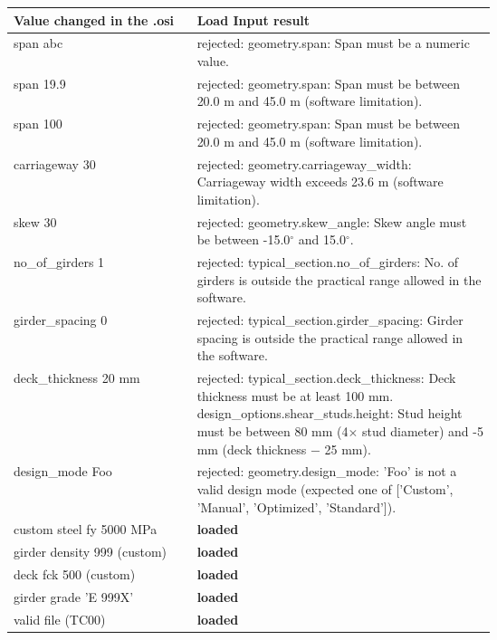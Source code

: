\begin{tabular}{@{}l>{\raggedright\arraybackslash}p{0.62\linewidth}@{}}
\toprule
Value changed in the .osi & Load Input result\\
\midrule
span abc & rejected: geometry.span: Span must be a numeric value.\\
span 19.9 & rejected: geometry.span: Span must be between 20.0 m and 45.0 m (software limitation).\\
span 100 & rejected: geometry.span: Span must be between 20.0 m and 45.0 m (software limitation).\\
carriageway 30 & rejected: geometry.carriageway\_width: Carriageway width exceeds 23.6 m (software limitation).\\
skew 30 & rejected: geometry.skew\_angle: Skew angle must be between -15.0$^\circ$ and 15.0$^\circ$.\\
no\_of\_girders 1 & rejected: typical\_section.no\_of\_girders: No. of girders is outside the practical range allowed in the software.\\
girder\_spacing 0 & rejected: typical\_section.girder\_spacing: Girder spacing is outside the practical range allowed in the software.\\
deck\_thickness 20 mm & rejected: typical\_section.deck\_thickness: Deck thickness must be at least 100 mm. design\_options.shear\_studs.height: Stud height must be between 80 mm (4$\times$ stud diameter) and -5 mm (deck thickness $-$ 25 mm).\\
design\_mode Foo & rejected: geometry.design\_mode: 'Foo' is not a valid design mode (expected one of ['Custom', 'Manual', 'Optimized', 'Standard']).\\
custom steel fy 5000 MPa & \textbf{loaded}\\
girder density 999 (custom) & \textbf{loaded}\\
deck fck 500 (custom) & \textbf{loaded}\\
girder grade 'E 999X' & \textbf{loaded}\\
valid file (TC00) & \textbf{loaded}\\
\bottomrule
\end{tabular}
